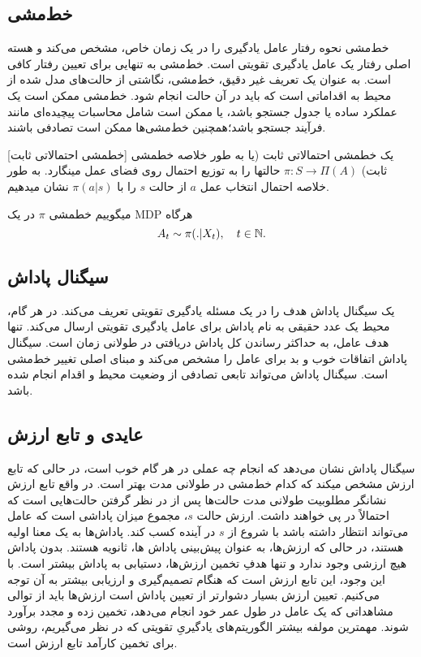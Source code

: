 \subsection{خط‌مشی}
خط‌مشی نحوه رفتار عامل یادگیری را در یک زمان خاص، مشخص می‌کند و هسته اصلی رفتار یک عامل یادگیری تقویتی است. خط‌مشی به تنهایی برای تعیین رفتار کافی است. به عنوان یک تعریف غیر دقیق، خط‌مشی، نگاشتی از حالت‌های مدل شده از محیط به اقداماتی است که باید در آن حالت انجام شود.
خط‌مشی ممکن است یک عملکرد ساده یا جدول جستجو باشد، یا ممکن است شامل محاسبات پیچیده‌ای مانند فرآیند جستجو باشد؛همچنین
خط‌مشی‌ها ممکن است تصادفی باشند.

[خط\nf مشی احتمالاتی ثابت]
یک خط\nf مشی احتمالاتی ثابت (یا به طور خلاصه خط\nf مشی ثابت) 
$\pi: S \to \Pi(A)$
حالت\nf ها را به توزیع احتمال روی فضای عمل می\nf نگارد.
به طور خلاصه احتمال انتخاب عمل $a$ از حالت $s$ را با
$\pi(a|s)$
نشان می\nf دهیم.

 می\nf گوییم خط\nf مشی $\pi$ در یک MDP  هرگاه
$$A_t \sim \pi(. |X_t),	 \quad t \in \mathbb{N}.$$

\subsection{سیگنال پاداش}

یک سیگنال پاداش هدف را در یک مسئله یادگیری تقویتی تعریف می‌کند. در هر گام، محیط یک عدد حقیقی به نام پاداش برای عامل یادگیری تقویتی ارسال می‌کند. تنها هدف عامل، به حداکثر رساندن کل پاداش دریافتی در طولانی زمان است. سیگنال پاداش اتفاقات خوب و بد برای عامل را مشخص می‌کند و مبنای اصلی تغییر خط‌مشی است.
سیگنال پاداش می‌تواند تابعی تصادفی از وضعیت محیط و اقدام انجام شده باشد.


\subsection{عایدی و تابع ارزش}
 سیگنال پاداش نشان می‌دهد که انجام چه عملی در هر گام خوب است، در حالی که تابع ارزش مشخص می\nf کند که کدام خط‌مشی در طولانی مدت بهتر است. در واقع تابع ارزش نشانگر مطلوبیت طولانی مدت حالت‌ها پس از در نظر گرفتن حالت‌هایی است که احتمالاً در پی خواهند داشت.
ارزش حالت $s$، مجموع میزان پاداشی است که عامل می‌تواند انتظار داشته باشد با شروع از $s$ در آینده کسب کند.
پاداش‌ها به یک معنا اولیه هستند، در حالی که ارزش‌ها، به عنوان پیش‌بینی پاداش ها، ثانویه هستند. بدون پاداش هیچ ارزشی وجود ندارد و تنها هدفِ تخمین ارزش‌ها، دستیابی به پاداش بیشتر است. با این وجود، این تابع ارزش است که هنگام تصمیم‌گیری و ارزیابی بیشتر به آن توجه می‌کنیم.
تعیین ارزش‌ بسیار دشوارتر از تعیین پاداش است
ارزش‌ها باید از توالی مشاهداتی که یک عامل در طول عمر خود انجام می‌دهد، تخمین زده و مجدد برآورد شوند.
مهمترین مولفه بیشتر الگوریتم‌های یادگیریِ تقویتی که در نظر می‌گیریم، روشی برای تخمین کارآمد تابع ارزش است.

